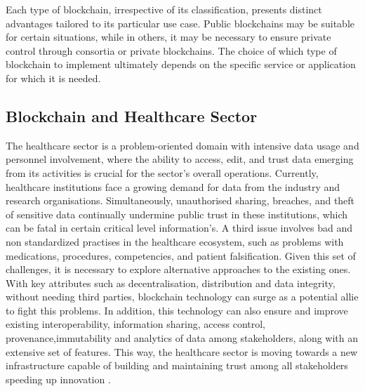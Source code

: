 Each type of blockchain, irrespective of its classification, presents distinct advantages tailored to its particular use case. Public blockchains may be suitable for certain situations, while in others, it may be necessary to ensure private control through consortia or private blockchains. The choice of which type of blockchain to implement ultimately depends on the specific service or application for which it is needed.

\subsection{Blockchain and Healthcare Sector}
The healthcare sector is a problem-oriented domain with intensive data usage and personnel involvement, where the ability to access, edit, and trust data emerging from its activities is crucial for the sector's overall operations. Currently, healthcare institutions face a growing demand for data from the industry and research organisations. Simultaneously, unauthorised sharing, breaches, and theft of sensitive data continually undermine public trust in these institutions, which can be fatal in certain critical level information's. A third issue involves bad and non standardized practises in the healthcare ecosystem, such as problems with medications, procedures, competencies, and patient falsification. Given this set of challenges, it is necessary to explore alternative approaches to the existing ones. With key attributes such as decentralisation, distribution and data integrity, without needing third parties, blockchain technology can surge as a potential allie to fight this problems. In addition, this technology can also ensure and improve existing interoperability, information sharing, access control, provenance,immutability and analytics of data among stakeholders, along with an extensive set of features. This way, the healthcare sector is moving towards a new infrastructure capable of building and maintaining trust among all stakeholders speeding up innovation \cite{systematic-review-of-blockchain}.

